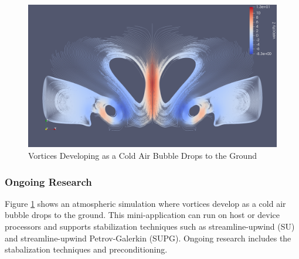 \begin{figure}[ht!]
\includegraphics[width=.99\linewidth]{../img/Vortices}
\caption{Vortices Developing as a Cold Air Bubble Drops to the Ground}
\label{fig:vortices}
\end{figure}

\subsubsection{Ongoing Research}

Figure \ref{fig:vortices} shows an atmospheric simulation where vortices develop as a cold air bubble drops to the ground.
This mini-application can run on host or device processors and supports stabilization techniques such as streamline-upwind (SU) and streamline-upwind Petrov-Galerkin (SUPG).
Ongoing research includes the stabalization techniques and preconditioning.
